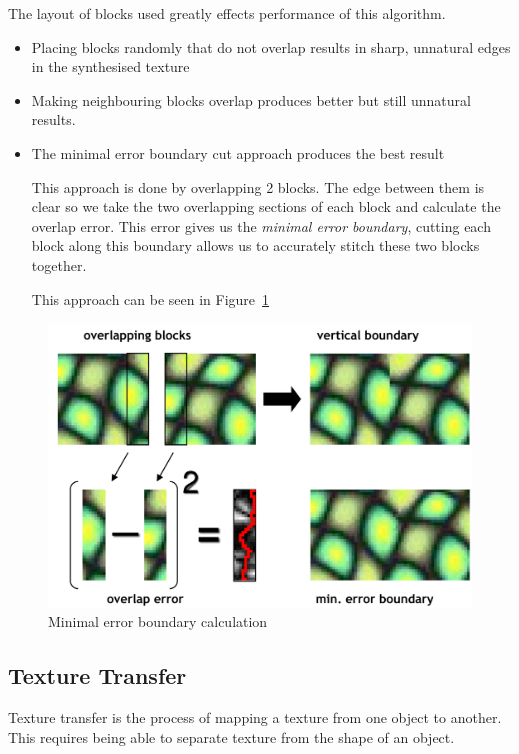 \documentclass{article}
\begin{document}
The layout of blocks used greatly effects performance of this algorithm.

\begin{itemize}
  \item Placing blocks randomly that do not overlap results in sharp, unnatural edges in the synthesised texture
  \item Making neighbouring blocks overlap produces better but still unnatural results.
  \item The minimal error boundary cut approach produces the best result

        This approach is done by overlapping 2 blocks. The edge between them is clear so we take the two overlapping sections of each block and calculate the overlap error. This error gives us the \textit{minimal error boundary}, cutting each block along this boundary allows us to accurately stitch these two blocks together.

        This approach can be seen in Figure~\ref{fig:meb}
\end{itemize}

\begin{figure}[ht]
  \centering
  \includegraphics[scale=0.3]{figures/l4-1.png}
  \caption{\label{fig:meb} Minimal error boundary calculation}
\end{figure}

\subsection{Texture Transfer}

Texture transfer is the process of mapping a texture from one object to another. This requires being able to separate texture from the shape of an object.
\end{document}
